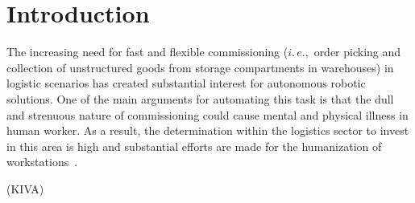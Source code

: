 \section{Introduction}
\label{sec:intro}
%
The increasing need for fast and flexible commissioning ($i.\,e.,$ order picking and collection of
unstructured goods from storage compartments in warehouses) in logistic scenarios has created
substantial interest for autonomous robotic solutions. One of the main arguments for automating this
task is that the dull and strenuous nature of commissioning could cause mental and physical illness
in human worker. As a result, the determination within the logistics sector to invest in this area
is high and substantial efforts are made for the humanization of workstations~\cite{Eche08}.


\cite{Wurm08}(KIVA) 


